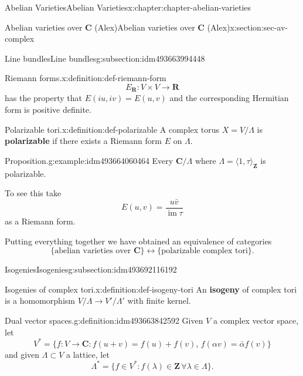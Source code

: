 \documentclass[oneside,10pt,]{book}
\newcommand{\terminology}[1]{\textbf{#1}}
\numberwithin{equation}{section}
\newcommand{\ZZ}{\mathbf{Z}}
\newcommand{\RR}{\mathbf{R}}
\newcommand{\CC}{\mathbf{C}}
\DeclareMathOperator{\im}{im}
\begin{document}
\begin{chapterptx}{Abelian Varieties}{}{Abelian Varieties}{}{}{x:chapter:chapter-abelian-varieties}
\begin{sectionptx}{Abelian varieties over \(\CC\) (Alex)}{}{Abelian varieties over \(\CC\) (Alex)}{}{}{x:section:sec-av-complex}
\begin{subsectionptx}{Line bundles}{}{Line bundles}{}{}{g:subsection:idm493663994448}
\begin{definition}{Riemann forms.}{x:definition:def-riemann-form}
\begin{equation*}
E_\RR \colon V\times V\to \RR
\end{equation*}
has the property that \(E(iu,iv) = E(u,v)\) and  the corresponding Hermitian form is positive definite.%
\end{definition}
\begin{definition}{Polarizable tori.}{x:definition:def-polarizable}%
A complex torus \(X = V/\Lambda\) is \terminology{polarizable} if there exists a Riemann form \(E\) on \(\Lambda\).%
\end{definition}
\begin{example}{Proposition.}{g:example:idm493664060464}%
Every \(\CC/\Lambda\) where \(\Lambda = \langle 1,\tau\rangle_{\ZZ}\) is polarizable.%
\par
To see this take%
\begin{equation*}
E(u,v) = \frac{u\bar v}{\im \tau}
\end{equation*}
as a Riemann form.%
\end{example}
Putting everything together we have obtained an equivalence of categories%
\begin{equation*}
\{\text{abelian varieties over } \CC\} \leftrightarrow \{\text{polarizable complex tori}\}\text{.}
\end{equation*}
%
\end{subsectionptx}
%
%
\typeout{************************************************}
\typeout{************************************************}
%
\begin{subsectionptx}{Isogenies}{}{Isogenies}{}{}{g:subsection:idm493692116192}
\begin{definition}{Isogenies of complex tori.}{x:definition:def-isogeny-tori}%
An \terminology{isogeny} of complex tori is a homomorphism \(V/\Lambda \to V'/\Lambda'\) with finite kernel.%
\end{definition}
\begin{definition}{Dual vector spaces.}{g:definition:idm493663842592}%
Given \(V\) a complex vector space, let%
\begin{equation*}
V^* = \{f\colon V\to \CC : f(u+v) = f(u)+f(v),\,f(\alpha v) = \bar \alpha f(v) \}
\end{equation*}
and given \(\Lambda \subset V\) a lattice, let%
\begin{equation*}
\Lambda^* = \{f\in V^* : f(\lambda) \in \ZZ\,\forall \lambda\in \Lambda\}\text{.}
\end{equation*}
%
\end{definition}

\end{subsectionptx}
\end{sectionptx}
\end{chapterptx}
\end{document}
